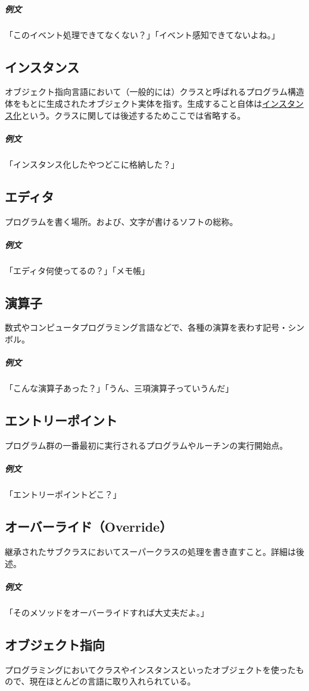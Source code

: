 \documentclass[a4paper]{ltjsreport}
\begin{document}
\subparagraph{例文} 「このイベント処理できてなくない？」「イベント感知できてないよね。」

\subsection{インスタンス}
オブジェクト指向言語において（一般的には）クラスと呼ばれるプログラム構造体をもとに生成されたオブジェクト実体を指す。生成すること自体は\underline{インスタンス化}という。クラスに関しては後述するためここでは省略する。

\subparagraph{例文} 「インスタンス化したやつどこに格納した？」

\subsection{エディタ}
プログラムを書く場所。および、文字が書けるソフトの総称。

\subparagraph{例文} 「エディタ何使ってるの？」「メモ帳」

\subsection{演算子}
数式やコンピュータプログラミング言語などで、各種の演算を表わす記号・シンボル。

\subparagraph{例文} 「こんな演算子あった？」「うん、三項演算子っていうんだ」

\subsection{エントリーポイント}
プログラム群の一番最初に実行されるプログラムやルーチンの実行開始点。

\subparagraph{例文} 「エントリーポイントどこ？」

\subsection{オーバーライド（Override）}
継承されたサブクラスにおいてスーパークラスの処理を書き直すこと。詳細は後述。

\subparagraph{例文} 「そのメソッドをオーバーライドすれば大丈夫だよ。」

\subsection{オブジェクト指向}
プログラミングにおいてクラスやインスタンスといったオブジェクトを使ったもので、現在ほとんどの言語に取り入れられている。
\end{document}
